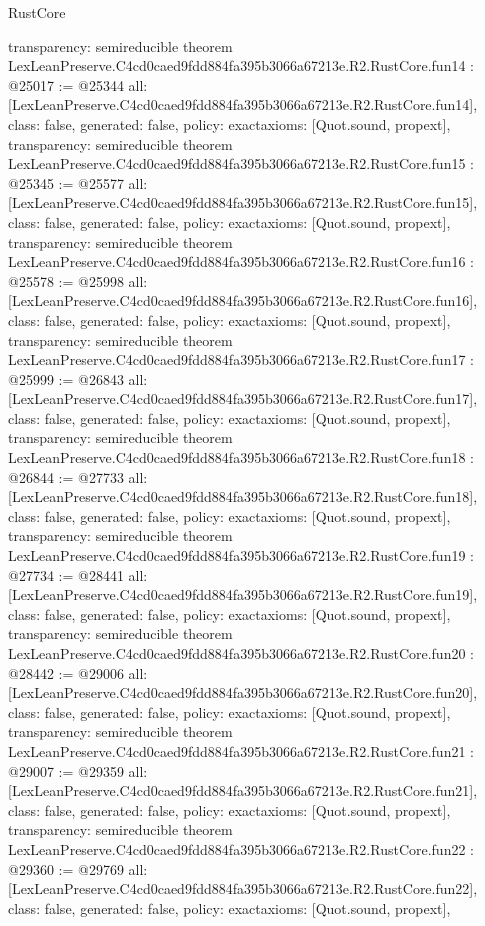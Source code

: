 \begin{lexlean}{RustCore}
\begin{coremodule}
{  transparency: semireducible
}
theorem LexLeanPreserve.C4cd0caed9fdd884fa395b3066a67213e.R2.RustCore.fun14 : @25017 := @25344 {
  all: [LexLeanPreserve.C4cd0caed9fdd884fa395b3066a67213e.R2.RustCore.fun14],
  class: false,
  generated: false,
  policy: exact{axioms: [Quot.sound, propext]},
  transparency: semireducible
}
theorem LexLeanPreserve.C4cd0caed9fdd884fa395b3066a67213e.R2.RustCore.fun15 : @25345 := @25577 {
  all: [LexLeanPreserve.C4cd0caed9fdd884fa395b3066a67213e.R2.RustCore.fun15],
  class: false,
  generated: false,
  policy: exact{axioms: [Quot.sound, propext]},
  transparency: semireducible
}
theorem LexLeanPreserve.C4cd0caed9fdd884fa395b3066a67213e.R2.RustCore.fun16 : @25578 := @25998 {
  all: [LexLeanPreserve.C4cd0caed9fdd884fa395b3066a67213e.R2.RustCore.fun16],
  class: false,
  generated: false,
  policy: exact{axioms: [Quot.sound, propext]},
  transparency: semireducible
}
theorem LexLeanPreserve.C4cd0caed9fdd884fa395b3066a67213e.R2.RustCore.fun17 : @25999 := @26843 {
  all: [LexLeanPreserve.C4cd0caed9fdd884fa395b3066a67213e.R2.RustCore.fun17],
  class: false,
  generated: false,
  policy: exact{axioms: [Quot.sound, propext]},
  transparency: semireducible
}
theorem LexLeanPreserve.C4cd0caed9fdd884fa395b3066a67213e.R2.RustCore.fun18 : @26844 := @27733 {
  all: [LexLeanPreserve.C4cd0caed9fdd884fa395b3066a67213e.R2.RustCore.fun18],
  class: false,
  generated: false,
  policy: exact{axioms: [Quot.sound, propext]},
  transparency: semireducible
}
theorem LexLeanPreserve.C4cd0caed9fdd884fa395b3066a67213e.R2.RustCore.fun19 : @27734 := @28441 {
  all: [LexLeanPreserve.C4cd0caed9fdd884fa395b3066a67213e.R2.RustCore.fun19],
  class: false,
  generated: false,
  policy: exact{axioms: [Quot.sound, propext]},
  transparency: semireducible
}
theorem LexLeanPreserve.C4cd0caed9fdd884fa395b3066a67213e.R2.RustCore.fun20 : @28442 := @29006 {
  all: [LexLeanPreserve.C4cd0caed9fdd884fa395b3066a67213e.R2.RustCore.fun20],
  class: false,
  generated: false,
  policy: exact{axioms: [Quot.sound, propext]},
  transparency: semireducible
}
theorem LexLeanPreserve.C4cd0caed9fdd884fa395b3066a67213e.R2.RustCore.fun21 : @29007 := @29359 {
  all: [LexLeanPreserve.C4cd0caed9fdd884fa395b3066a67213e.R2.RustCore.fun21],
  class: false,
  generated: false,
  policy: exact{axioms: [Quot.sound, propext]},
  transparency: semireducible
}
theorem LexLeanPreserve.C4cd0caed9fdd884fa395b3066a67213e.R2.RustCore.fun22 : @29360 := @29769 {
  all: [LexLeanPreserve.C4cd0caed9fdd884fa395b3066a67213e.R2.RustCore.fun22],
  class: false,
  generated: false,
  policy: exact{axioms: [Quot.sound, propext]},
}
\end{coremodule}
\end{lexlean}
